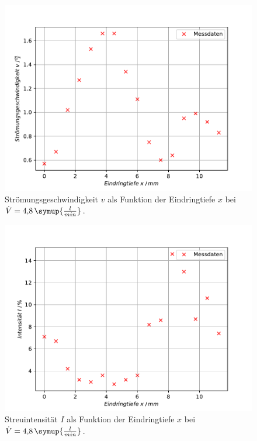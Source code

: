 \begin{table}[htbp]
\begin{tabular}{S[table-format=2.1] S[table-format=2.2] S[table-format=2.3] S[table-format=2.2] S[table-format=2.3] S[table-format=1.2]  }
\bottomrule
\end{tabular}
\end{table}


\begin{figure}[h!tbp]
	\centering
	\includegraphics[width=0.8\linewidth]{geschw_48.pdf}
	\caption{Strömungsgeschwindigkeit $v$ als Funktion der Eindringtiefe $x$ bei $\dot{V} = 4{,}8\,\symup{\frac{l}{min}}$.}
	\label{fig:profil1}
\end{figure}


\begin{figure}[h!tbp]
	\centering
	\includegraphics[width=0.8\linewidth]{streu_48.pdf}
	\caption{Streuintensität $I$ als Funktion der Eindringtiefe $x$ bei $\dot{V} = 4{,}8\,\symup{\frac{l}{min}}$.}
	\label{fig:profil2}
\end{figure}


